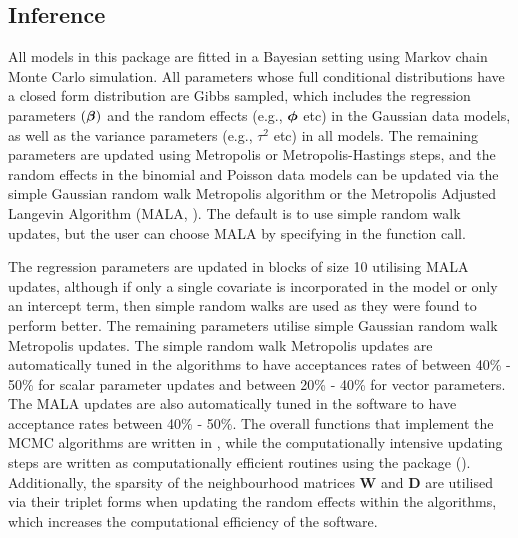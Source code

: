 \documentclass[article, nojss]{jss}
\newcommand{\bd}[1]{\ensuremath{\mbox{\boldmath $#1$}}}
\begin{document}
\subsection{Inference}
All models in this package are fitted in a Bayesian setting using Markov chain Monte Carlo simulation. All parameters whose full conditional distributions have a closed form distribution are Gibbs sampled, which includes the regression parameters $(\bd{\beta})$ and the random effects (e.g., $\bd{\phi}$ etc) in the Gaussian data models, as well as the variance parameters (e.g., $\tau^2$ etc) in all models. The remaining parameters are updated using Metropolis or Metropolis-Hastings steps, and the random effects in the binomial and Poisson data models can be updated via the simple Gaussian random walk Metropolis algorithm or the Metropolis Adjusted Langevin Algorithm (MALA, \citealp{roberts1998}). The default is to use simple random walk updates, but the user can choose MALA by specifying  in the function call. 

\hspace{1cm} The regression parameters are updated in blocks of size 10 utilising MALA updates, although if only a single covariate is incorporated in the model or only an intercept term, then simple random walks are used as they were found to perform better. The remaining parameters utilise simple Gaussian random walk Metropolis updates. The simple random walk Metropolis updates are automatically tuned in the algorithms to have acceptances rates of between 40\% - 50\% for scalar parameter updates and between 20\% - 40\% for vector parameters. The MALA updates are also automatically tuned in the software to have acceptance rates between 40\% - 50\%. The overall functions that implement the MCMC algorithms are written in , while the computationally intensive updating steps are written as computationally efficient   routines using the  package  (\citealp{eddelbuettel2011}). Additionally, the sparsity of the neighbourhood matrices $\mathbf{W}$ and $\mathbf{D}$ are utilised via their triplet forms when updating the random effects  within the algorithms, which increases the computational efficiency of the software.
\end{document}
